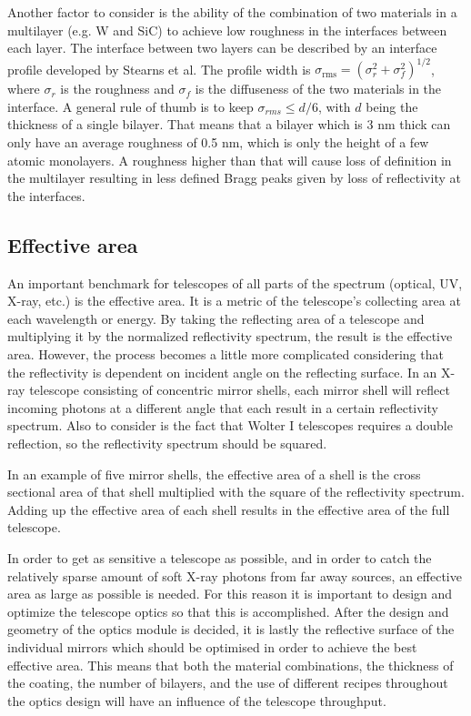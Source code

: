 Another factor to consider is the ability of the combination of two materials in a multilayer (e.g. W and SiC) to achieve low roughness in the interfaces between each layer. The interface between two layers can be described by an interface profile developed by Stearns et al\cite{Stearns:1989va}. The profile width is $\sigma_{\text{rms}}=(\sigma_r^2 + \sigma_f^2)^{1/2}$, where $\sigma_r$ is the roughness and $\sigma_f$ is the diffuseness of the two materials in the interface. A general rule of thumb is to keep $\sigma_{rms} \leq d/6$, with $d$ being the thickness of a single bilayer. That means that a bilayer which is 3 nm thick can only have an average roughness of 0.5 nm, which is only the height of a few atomic monolayers. A roughness higher than that will cause loss of definition in the multilayer resulting in less defined Bragg peaks given by loss of reflectivity at the interfaces.

\subsection{Effective area}\label{sec:eff_area}
An important benchmark for telescopes of all parts of the spectrum (optical, UV, X-ray, etc.) is the effective area. It is a metric of the telescope's collecting area at each wavelength or energy. By taking the reflecting area of a telescope and multiplying it by the normalized reflectivity spectrum, the result is the effective area. However, the process becomes a little more complicated considering that the reflectivity is dependent on incident angle on the reflecting surface. In an X-ray telescope consisting of concentric mirror shells, each mirror shell will reflect incoming photons at a different angle that each result in a certain reflectivity spectrum. Also to consider is the fact that Wolter I telescopes requires a double reflection, so the reflectivity spectrum should be squared.

In an example of five mirror shells, the effective area of a shell is the cross sectional area of that shell multiplied with the square of the reflectivity spectrum. Adding up the effective area of each shell results in the effective area of the full telescope.

In order to get as sensitive a telescope as possible, and in order to catch the relatively sparse amount of soft X-ray photons from far away sources, an effective area as large as possible is needed. For this reason it is important to design and optimize the telescope optics so that this is accomplished. After the design and geometry of the optics module is decided, it is lastly the reflective surface of the individual mirrors which should be optimised in order to achieve the best effective area. This means that both the material combinations, the thickness of the coating, the number of bilayers, and the use of different recipes throughout the optics design will have an influence of the telescope throughput.


